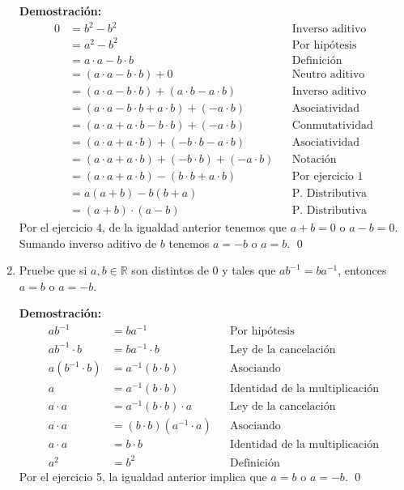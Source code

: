 \documentclass[11pt]{article}
\newcommand{\R}{\mathbb{R}}
\begin{document}
\begin{enumerate}
\textbf{Demostración:}
\begin{align*}
  0 &= b^2 - b^2 && \text{Inverso aditivo}\\
  &= a^2 - b^2 && \text{Por hipótesis	}\\
  &= a \cdot a - b \cdot b && \text{Definición}\\
  &= (a \cdot a - b \cdot b) + 0&& \text{Neutro aditivo}\\
  &= (a \cdot a - b \cdot b) + (a\cdot b-a\cdot b)&& \text{Inverso aditivo}\\
  &= (a \cdot a - b \cdot b + a\cdot b) + (-a\cdot b)&& \text{Asociatividad}\\
  &= (a \cdot a + a\cdot b - b \cdot b) + (-a\cdot b)&& \text{Conmutatividad}\\
  &= (a \cdot a + a\cdot b) + (- b \cdot b-a\cdot b)&& \text{Asociatividad}\\
  &= (a \cdot a + a\cdot b) + (- b \cdot b)+(-a\cdot b)&& \text{Notación}\\
  &= (a \cdot a + a\cdot b) -(b \cdot b + a\cdot b)&& \text{Por ejercicio 1}\\
  &= a (a+b) - b(b+a) && \text{P. Distributiva}\\
  &= (a+b) \cdot (a-b) && \text{P. Distributiva}
\end{align*} Por el ejercicio 4, de la igualdad anterior tenemos que $a+b=0$ o $a-b=0$. Sumando inverso aditivo de $b$ tenemos $a=-b$ o $a=b$. \qed

\pagebreak

\item Pruebe que si $a,b\in \R$ son distintos de $0$ y tales que $ab^{-1}=ba^{-1}$, entonces $a=b$ o $a=-b$.

\textbf{Demostración:}
\begin{align*}
  ab^{-1}&=ba^{-1} && \text{Por hipótesis}\\
  ab^{-1} \cdot b &=ba^{-1} \cdot b&& \text{Ley de la cancelación}\\
  a(b^{-1} \cdot b) &=a^{-1}(b\cdot b) && \text{Asociando}\\
  a &=a^{-1}(b\cdot b) && \text{Identidad de la multiplicación}\\
  a \cdot a&=a^{-1}(b\cdot b) \cdot a&& \text{Ley de la cancelación}\\
  a \cdot a&= (b\cdot b) (a^{-1} \cdot a)&& \text{Asociando}\\
  a \cdot a&= b\cdot b && \text{Identidad de la multiplicación}\\
  a^2 &= b^2 && \text{Definición}
\end{align*}
Por el ejercicio 5, la igualdad anterior implica que $a=b$ o $a=-b$. \qed


\end{enumerate}
\end{document}
